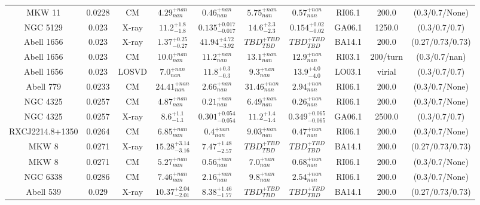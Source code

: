 \begin{table}
\begin{tabular}{cccccccccc}
MKW 11 & 0.0228 & CM & ${4.29}^{+nan}_{nan}$ & ${0.46}^{+nan}_{nan}$ & ${5.75}^{+nan}_{nan}$ & ${0.57}^{+nan}_{nan}$ & RI06.1 & 200.0 & (0.3/0.7/None) \\
NGC 5129 & 0.023 & X-ray & ${11.2}^{+1.8}_{-1.8}$ & ${0.135}^{+0.017}_{-0.017}$ & ${14.6}^{+2.3}_{-2.3}$ & ${0.154}^{+0.02}_{-0.02}$ & GA06.1 & 1250.0 & (0.3/0.7/0.7) \\
Abell 1656 & 0.023 & X-ray & ${1.37}^{+0.25}_{-0.27}$ & ${41.94}^{+4.72}_{-3.92}$ & ${TBD}^{+TBD}_{TBD}$ & ${TBD}^{+TBD}_{TBD}$ & BA14.1 & 200.0 & (0.27/0.73/0.73) \\
Abell 1656 & 0.023 & CM & ${10.0}^{+nan}_{nan}$ & ${11.2}^{+nan}_{nan}$ & ${13.1}^{+nan}_{nan}$ & ${12.9}^{+nan}_{nan}$ & RI03.1 & 200/turn & (0.3/0.7/nan) \\
Abell 1656 & 0.023 & LOSVD & ${7.0}^{+nan}_{nan}$ & ${11.8}^{+0.3}_{-0.3}$ & ${9.3}^{+nan}_{nan}$ & ${13.9}^{+4.0}_{-4.0}$ & LO03.1 & virial & (0.3/0.7/0.7) \\
Abell 779 & 0.0233 & CM & ${24.41}^{+nan}_{nan}$ & ${2.66}^{+nan}_{nan}$ & ${31.46}^{+nan}_{nan}$ & ${2.94}^{+nan}_{nan}$ & RI06.1 & 200.0 & (0.3/0.7/None) \\
NGC 4325 & 0.0257 & CM & ${4.87}^{+nan}_{nan}$ & ${0.21}^{+nan}_{nan}$ & ${6.49}^{+nan}_{nan}$ & ${0.26}^{+nan}_{nan}$ & RI06.1 & 200.0 & (0.3/0.7/None) \\
NGC 4325 & 0.0257 & X-ray & ${8.6}^{+1.1}_{-1.1}$ & ${0.301}^{+0.054}_{-0.054}$ & ${11.2}^{+1.4}_{-1.4}$ & ${0.349}^{+0.065}_{-0.065}$ & GA06.1 & 2500.0 & (0.3/0.7/0.7) \\
RXCJ2214.8+1350 & 0.0264 & CM & ${6.85}^{+nan}_{nan}$ & ${0.4}^{+nan}_{nan}$ & ${9.03}^{+nan}_{nan}$ & ${0.47}^{+nan}_{nan}$ & RI06.1 & 200.0 & (0.3/0.7/None) \\
MKW 8 & 0.0271 & X-ray & ${15.28}^{+3.14}_{-3.16}$ & ${7.47}^{+1.48}_{-2.57}$ & ${TBD}^{+TBD}_{TBD}$ & ${TBD}^{+TBD}_{TBD}$ & BA14.1 & 200.0 & (0.27/0.73/0.73) \\
MKW 8 & 0.0271 & CM & ${5.27}^{+nan}_{nan}$ & ${0.56}^{+nan}_{nan}$ & ${7.0}^{+nan}_{nan}$ & ${0.68}^{+nan}_{nan}$ & RI06.1 & 200.0 & (0.3/0.7/None) \\
NGC 6338 & 0.0286 & CM & ${7.46}^{+nan}_{nan}$ & ${2.16}^{+nan}_{nan}$ & ${9.8}^{+nan}_{nan}$ & ${2.54}^{+nan}_{nan}$ & RI06.1 & 200.0 & (0.3/0.7/None) \\
Abell 539 & 0.029 & X-ray & ${10.37}^{+2.04}_{-2.01}$ & ${8.38}^{+1.46}_{-1.77}$ & ${TBD}^{+TBD}_{TBD}$ & ${TBD}^{+TBD}_{TBD}$ & BA14.1 & 200.0 & (0.27/0.73/0.73) \\

\end{tabular}
\end{table}
